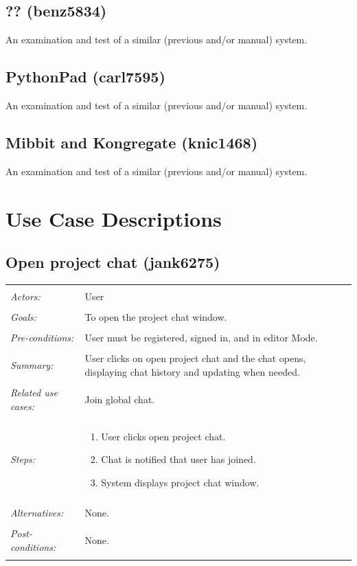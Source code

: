 \documentclass[11pt]{report}
\begin{document}
\begin{IDE-like Features}
\begin{}
\begin{Collaborative features that would be "nice":}
\subsection{?? (benz5834)}
An examination and test of a similar (previous and/or manual) system.

\subsection{PythonPad (carl7595)}
An examination and test of a similar (previous and/or manual) system.

\subsection{Mibbit and Kongregate (knic1468)}
An examination and test of a similar (previous and/or manual) system.



\section{Use Case Descriptions}
\subsection{Open project chat (jank6275)}
\begin{tabular}{ p{2cm} p{12cm} }
 \hline
 \\
 \textit{Actors:} & User \\ 
 \\
 \textit{Goals:} & To open the project chat window. \\
 \\
 \textit{Pre-conditions:} & User must be registered, signed in, and in editor Mode.  \\
 \\
 \textit{Summary:} & User clicks on open project chat and the chat opens, displaying chat history and updating when needed. \\ 
 \\
 \textit{Related use cases:} & Join global chat. \\ 
 \\
 \textit{Steps:} & \begin{enumerate}
  \item User clicks open project chat.
  \item Chat is notified that user has joined.
  \item System displays project chat window.
 \end{enumerate} \\
 \\
 \textit{Alternatives:} & None. \\
 \\
 \textit{Post-conditions:} & None. \\
 \\
\hline
\end{tabular}


\end{Collaborative features that would be "nice":}
\end{}
\end{IDE-like Features}
\end{document}

